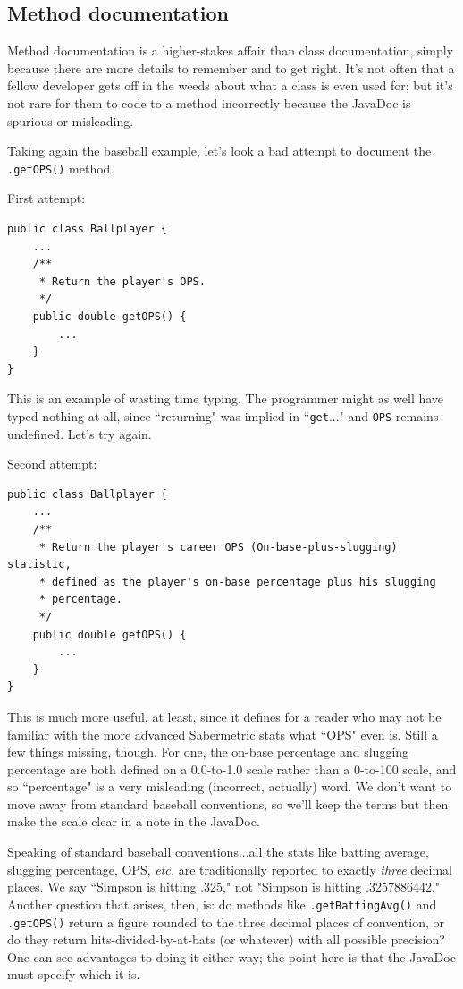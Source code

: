 \subsection{Method documentation}

Method documentation is a higher-stakes affair than class documentation,
simply because there are more details to remember and to get right. It's not
often that a fellow developer gets off in the weeds about what a class is even
used for; but it's not rare for them to code to a method incorrectly because
the JavaDoc is spurious or misleading.

Taking again the baseball example, let's look a bad attempt to document the
\texttt{.getOPS()} method.

First attempt:
\vspace{-.15in}
\begin{Verbatim}[fontsize=\small,samepage=true,frame=single]
public class Ballplayer {
    ...
    /**
     * Return the player's OPS.
     */
    public double getOPS() {
        ...
    }
}
\end{Verbatim}

This is an example of wasting time typing. The programmer might as well have
typed nothing at all, since ``returning" was implied in ``\texttt{get}..." and
\texttt{OPS} remains undefined. Let's try again.

Second attempt:
\vspace{-.15in}
\begin{Verbatim}[fontsize=\small,samepage=true,frame=single]
public class Ballplayer {
    ...
    /**
     * Return the player's career OPS (On-base-plus-slugging) statistic,
     * defined as the player's on-base percentage plus his slugging 
     * percentage.
     */
    public double getOPS() {
        ...
    }
}
\end{Verbatim}

This is much more useful, at least, since it defines for a reader who may not
be familiar with the more advanced Sabermetric stats what ``OPS" even is.
Still a few things missing, though. For one, the on-base percentage and
slugging percentage are both defined on a 0.0-to-1.0 scale rather than a
0-to-100 scale, and so ``percentage" is a very misleading (incorrect,
actually) word. We don't want to move away from standard baseball
conventions, so we'll keep the terms but then make the scale clear in a note
in the JavaDoc.

Speaking of standard baseball conventions...all the stats like batting
average, slugging percentage, OPS, \textit{etc.} are traditionally reported to
exactly \textit{three} decimal places. We say ``Simpson is hitting .325," not
"Simpson is hitting .3257886442." Another question that arises, then, is: do
methods like \texttt{.getBattingAvg()} and \texttt{.getOPS()} return a figure
rounded to the three decimal places of convention, or do they return
hits-divided-by-at-bats (or whatever) with all possible precision? One can see
advantages to doing it either way; the point here is that the JavaDoc must
specify which it is.

